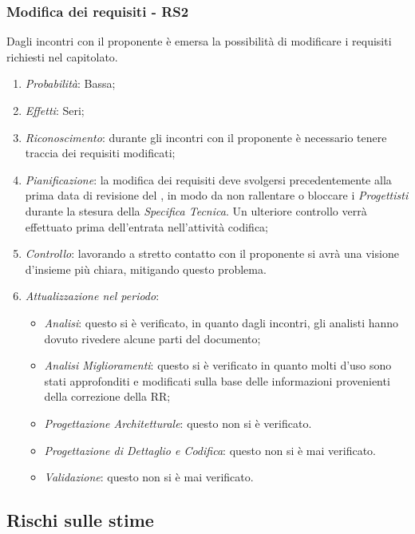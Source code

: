 \subsubsection{Modifica dei requisiti - RS2}
Dagli incontri con il proponente \`e emersa la possibilit\`a di modificare i requisiti richiesti nel capitolato.
\begin{enumerate}
\item \textit{Probabilit\`a}: Bassa;
\item \textit{Effetti}: Seri;
\item \textit{Riconoscimento}: durante gli incontri con il proponente è necessario tenere traccia dei requisiti modificati;
\item \textit{Pianificazione}: la modifica dei requisiti deve svolgersi precedentemente alla prima data di revisione del , in modo da non rallentare o bloccare i \textit{Progettisti} durante la stesura della \textit{Specifica Tecnica}. Un ulteriore controllo verr\`a effettuato prima dell'entrata nell'attivit\`a codifica;
\item \textit{Controllo}: lavorando a stretto contatto con il proponente si avr\`a una visione d'insieme pi\`u chiara, mitigando questo problema.
\item \textit{Attualizzazione nel periodo}: 
	\begin{itemize}
	\item \textit{Analisi}: questo  si è verificato, in quanto dagli incontri, gli analisti hanno dovuto rivedere alcune parti del documento;
	\item \textit{Analisi Miglioramenti}: questo  si è verificato in quanto molti  d'uso sono stati approfonditi e modificati sulla base delle informazioni provenienti della correzione della RR;
	\item \textit{Progettazione Architetturale}: questo  non si è verificato.
	\item \textit{Progettazione di Dettaglio e Codifica}: questo  non si è mai verificato.
	\item \textit{Validazione}: questo  non si è mai verificato.
	\end{itemize}
\end{enumerate}

\subsection{Rischi sulle stime}
